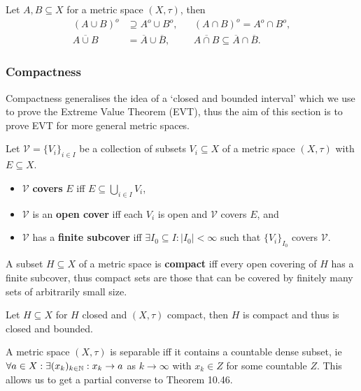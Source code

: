 \begin{multicols}{2}
\begin{theorem}[10.40]
Let $A,B\subseteq X$ for a metric space $(X,\tau)$, then
    \begin{align*}
        (A\cup B)^o &\supseteq A^o\cup B^o, && (A\cap B)^o = A^o\cap B^o, \\
        \overline{A\cup B} &=\overline{A}\cup\overline{B},
        && \overline{A\cap B} \subseteq \overline{A}\cap \overline{B}.
    \end{align*}
\end{theorem}

\subsubsection*{Compactness}
Compactness generalises the idea of a `closed and bounded interval' which we use to prove the Extreme Value Theorem (EVT), thus the aim of this section is to prove EVT for more general metric spaces.
\begin{definition}[Covering]
Let $\mathcal{V}=\{V_i\}_{i\in I}$ be a collection of subsets $V_i\subseteq X$ of a metric space $(X,\tau)$ with $E\subseteq X$.
    \begin{itemize}
        \item{$\mathcal{V}$ \textbf{covers} $E$ iff $E\subseteq \bigcup_{i\in I} V_i$,}
        \item{$\mathcal{V}$ is an \textbf{open cover} iff each $V_i$ is open and $\mathcal{V}$ covers $E$, and}
        \item{$\mathcal{V}$ has a \textbf{finite subcover} iff $\exists I_0\subseteq I:|I_0|<\infty$ such that $\{V_i\}_{I_0}$ covers $\mathcal{V}$.}
    \end{itemize}
\end{definition}

\begin{definition}[Compact]
A subset $H\subseteq X$ of a metric space is \textbf{compact} iff every open covering of $H$ has a finite subcover, thus compact sets are those that can be covered by finitely many sets of arbitrarily small size.
\end{definition}

\begin{theorem}[10.44-10.46]
Let $H\subseteq X$ for $H$ closed and $(X,\tau)$ compact, then $H$ is compact and thus is closed and bounded.
\end{theorem}

\begin{definition}[Separable]
A metric space $(X,\tau)$ is separable iff it contains a countable dense subset, ie $\forall a\in X: \exists (x_k)_{k\in\mathbb{N}}: x_k\to a$ as $k\to\infty$ with $x_k\in Z$ for some countable $Z$. This allows us to get a partial converse to Theorem 10.46.
\end{definition}


\end{multicols}
